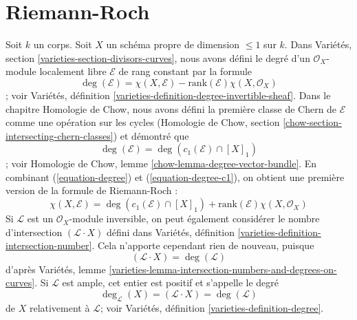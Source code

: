 \section{Riemann-Roch}
\label{section-Riemann-Roch}

\noindent
Soit $k$ un corps. Soit $X$ un schéma propre de dimension $\leq 1$ sur $k$. Dans Variétés, section \ref{varieties-section-divisors-curves}, nous avons défini le degré d'un $\mathcal{O}_X$-module localement libre $\mathcal{E}$ de rang constant par la formule \begin{equation}
\label{equation-degree}
\deg(\mathcal{E}) =
\chi(X, \mathcal{E}) - \text{rank}(\mathcal{E})\chi(X, \mathcal{O}_X)
\end{equation}; voir Variétés, définition \ref{varieties-definition-degree-invertible-sheaf}. Dans le chapitre Homologie de Chow, nous avons défini la première classe de Chern de $\mathcal{E}$ comme une opération sur les cycles (Homologie de Chow, section \ref{chow-section-intersecting-chern-classes}) et démontré que \begin{equation}
\label{equation-degree-c1}
\deg(\mathcal{E}) = \deg(c_1(\mathcal{E}) \cap [X]_1)
\end{equation}; voir Homologie de Chow, lemme \ref{chow-lemma-degree-vector-bundle}. En combinant (\ref{equation-degree}) et (\ref{equation-degree-c1}), on obtient une première version de la formule de Riemann-Roch : \begin{equation}
\label{equation-rr}
\chi(X, \mathcal{E}) =
\deg(c_1(\mathcal{E}) \cap [X]_1) +
\text{rank}(\mathcal{E})\chi(X, \mathcal{O}_X)
\end{equation} Si $\mathcal{L}$ est un $\mathcal{O}_X$-module inversible, on peut également considérer le nombre d'intersection $(\mathcal{L} \cdot X)$ défini dans Variétés, définition \ref{varieties-definition-intersection-number}. Cela n'apporte cependant rien de nouveau, puisque \begin{equation}
\label{equation-numerical-degree}
(\mathcal{L} \cdot X) = \deg(\mathcal{L})
\end{equation} d'après Variétés, lemme \ref{varieties-lemma-intersection-numbers-and-degrees-on-curves}. Si $\mathcal{L}$ est ample, cet entier est positif et s'appelle le degré \begin{equation}
\label{equation-degree-X}
\deg_\mathcal{L}(X) = (\mathcal{L} \cdot X) = \deg(\mathcal{L})
\end{equation} de $X$ relativement à $\mathcal{L}$; voir Variétés, définition \ref{varieties-definition-degree}.

